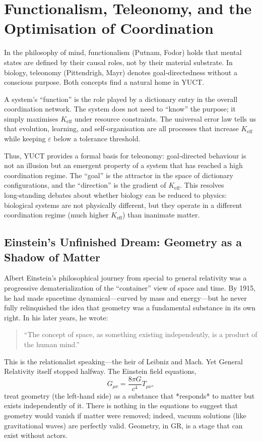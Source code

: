 \documentclass[12pt,a4paper]{article}
\begin{document}
	
	\section{Functionalism, Teleonomy, and the Optimisation of Coordination}
	
	In the philosophy of mind, functionalism (Putnam, Fodor) holds that mental states are defined by their causal roles, not by their material substrate. In biology, teleonomy (Pittendrigh, Mayr) denotes goal‑directedness without a conscious purpose. Both concepts find a natural home in YUCT.
	
	A system’s “function” is the role played by a dictionary entry in the overall coordination network. The system does not need to “know” the purpose; it simply maximises \(K_{\mathrm{eff}}\) under resource constraints. The universal error law tells us that evolution, learning, and self‑organisation are all processes that increase \(K_{\mathrm{eff}}\) while keeping \(\varepsilon\) below a tolerance threshold.
	
	Thus, YUCT provides a formal basis for teleonomy: goal‑directed behaviour is not an illusion but an emergent property of a system that has reached a high coordination regime. The “goal” is the attractor in the space of dictionary configurations, and the “direction” is the gradient of \(K_{\mathrm{eff}}\). This resolves long‑standing debates about whether biology can be reduced to physics: biological systems are not physically different, but they operate in a different coordination regime (much higher \(K_{\mathrm{eff}}\)) than inanimate matter.
	
	\subsection{Einstein's Unfinished Dream: Geometry as a Shadow of Matter}
	
	Albert Einstein's philosophical journey from special to general relativity was a progressive dematerialization of the ``container'' view of space and time. By 1915, he had made spacetime dynamical—curved by mass and energy—but he never fully relinquished the idea that geometry was a fundamental substance in its own right. In his later years, he wrote:
	
	\begin{quote}
		``The concept of space, as something existing independently, is a product of the human mind.''
	\end{quote}
	
	This is the relationalist speaking—the heir of Leibniz and Mach. Yet General Relativity itself stopped halfway. The Einstein field equations,
	\[
	G_{\mu\nu} = \frac{8\pi G}{c^4} T_{\mu\nu},
	\]
	treat geometry (the left-hand side) as a substance that *responds* to matter but exists independently of it. There is nothing in the equations to suggest that geometry would vanish if matter were removed; indeed, vacuum solutions (like gravitational waves) are perfectly valid. Geometry, in GR, is a stage that can exist without actors.
	
\end{document}
